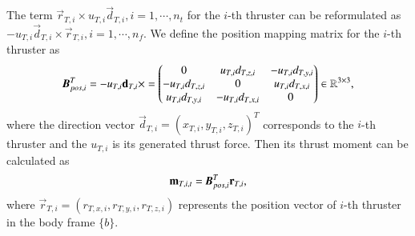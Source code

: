 The term $\vec{r}_{T,i}\times u_{T,i}\vec{d}_{T,i}, i=1, \cdots, n_{t}$ for the $i$-th thruster can be reformulated as $- u_{T,i}\vec{d}_{T,i}\times \vec{r}_{T,i}, i=1, \cdots, n_{f}$. We define the position mapping matrix for the $i$-th thruster as
\begin{align}
\emph{\textbf{B}}_{pos,i}^{T}=-u_{T,i}\vec{d}_{T,i}\times=
\begin{pmatrix}
0&u_{T,i}d_{T,z,i}&-u_{T,i}d_{T,y,i}\\
-u_{T,i}d_{T,z,i}&0&u_{T,i}d_{T,x,i}\\
u_{T,i}d_{T,y,i}&-u_{T,i}d_{T,x,i}&0\
\end{pmatrix} \in \mathbb{R}^{3 \times 3},
\end{align}
where the direction vector $\vec{d}_{T,i}=(x_{T,i}, y_{T,i}, z_{T,i})^{T}$ corresponds to the $i$-th thruster and the $u_{T,i}$ is its generated thrust force.
Then its thrust moment can be calculated as
\begin{align}
\vec{m}_{T,i,t}=\emph{\textbf{B}}_{pos,i}^{T}\vec{r}_{T,i},
\end{align}
where $\vec{r}_{T,i}=(r_{T,x,i}, r_{T,y,i}, r_{T,z,i})$ represents the position vector of $i$-th thruster in the body frame $\lbrace b \rbrace$.

